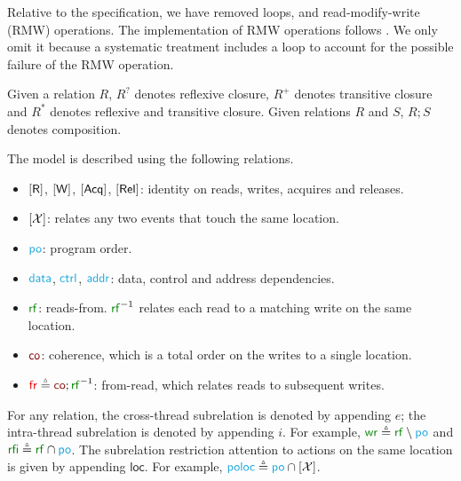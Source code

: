 Relative to the \armeight{} specification, we have removed loops, and
read-modify-write (RMW) operations.  The implementation of RMW operations
follows \citet{DBLP:journals/pacmpl/PodkopaevLV19}.  We only omit it because
a systematic treatment includes a loop to account for the possible failure of
the RMW operation.

Given a relation $R$, $R^?$ denotes reflexive closure, $R^+$ denotes
transitive closure and $R^*$ denotes reflexive and transitive closure.  Given
relations $R$ and $S$, $R;S$ denotes composition.

The \armeight{} model is described using the following relations.
\begin{itemize}
\item $[\mathsf{R}]$, $[\mathsf{W}]$, $[\mathsf{Acq}]$, $[\mathsf{Rel}]$: identity on reads, writes, acquires
  and releases.
\item $[\mathcal{X}]$: relates any two events that touch the same location.
\item $\rpox$: program order.
\item $\rdata$, $\rctrl$, $\raddr$: data, control and address dependencies.
\item $\rrfx$: reads-from. $\rrfx^{-1}$ relates each read to a matching write
  on the same location.
\item $\rco$: coherence, which is a total order on the writes to a single
  location.
\item ${\rfr}\eqdef{\rco};\rrfx^{-1}$: from-read, which relates reads to
  subsequent writes.
\end{itemize}
For any relation, the cross-thread subrelation is denoted by appending $e$;
the intra-thread subrelation is denoted by appending $i$.  For example,
${\rrfe}\eqdef{\rrfx}\setminus{\rpox}$ and ${\rrfi}\eqdef{\rrfx}\cap{\rpox}$.
The subrelation restriction attention to actions on the same location is
given by appending $\mathsf{loc}$.  For example, ${\rpoloc}\eqdef{\rpox}\cap{\IDLoc}$.

